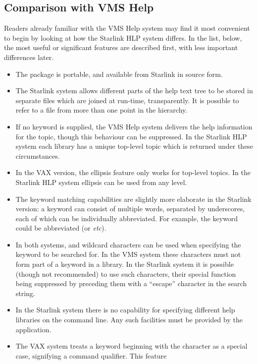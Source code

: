 \subsection{Comparison with VMS Help}
Readers already familiar with the VMS Help system may find it
most convenient to begin by looking at how the Starlink HLP
system differs.  In the
list, below, the most useful or significant features are
described first, with less important differences later.
\begin{itemize}
\item The package is portable, and available from Starlink in
source form.
\item The Starlink system allows different parts of the help text
tree to be stored in separate files which are joined
at run-time, transparently.  It is possible to refer to a file
from more than one point in the hierarchy.
\item If no keyword is supplied, the VMS Help system delivers
the help information for the  topic, though this
behaviour can be suppressed.  In the Starlink HLP
system each library has a unique top-level topic which is
returned under these circumstances.
\item In the VAX version, the  ellipsis feature
only works for top-level topics.  In the Starlink HLP system
ellipsis can be used from any level.
\item The keyword matching capabilities are slightly more
elaborate in the Starlink version: a keyword can consist
of multiple words, separated by
underscores, each of which can be individually abbreviated.
For example, the keyword  could
be abbreviated  (or  {\it etc}).
\item In both systems, \fstring{\%} and \fstring{*}
wildcard characters can be used
when specifying the keyword to be searched for.  In the VMS system
these characters
must not form part of a keyword in a library.  In the Starlink
system it is possible (though not recommended) to use such
characters, their special function being
suppressed by preceding them with a \fstring{$\backslash$}
``escape'' character in the search string.
\item In the Starlink system there is no capability for specifying
different help libraries on the command line.  Any such facilities
must be provided by the application.
\item The VAX system treats a keyword beginning with the character
\fstring{/} as a special case, signifying a command qualifier.  This feature

\end{itemize}
